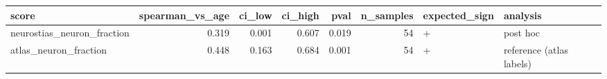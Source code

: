 \begin{tabular}{lrrrrrll}
\toprule
score & spearman_vs_age & ci_low & ci_high & pval & n_samples & expected_sign & analysis \\
\midrule
neurostias_neuron_fraction & 0.319 & 0.001 & 0.607 & 0.019 & 54 & + & post hoc \\
atlas_neuron_fraction & 0.448 & 0.163 & 0.684 & 0.001 & 54 & + & reference (atlas labels) \\
\bottomrule
\end{tabular}
